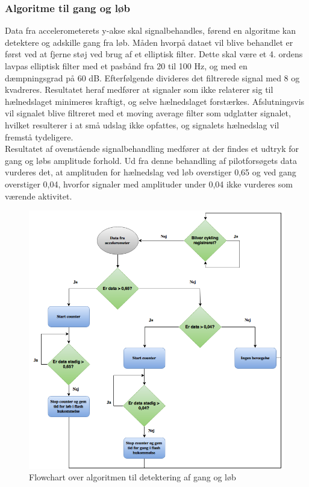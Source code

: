 \subsubsection{Algoritme til gang og løb}
Data fra accelerometerets y-akse skal signalbehandles, førend en algoritme kan detektere og adskille gang fra løb. Måden hvorpå dataet vil blive behandlet er først ved at fjerne støj ved brug af et elliptisk filter. Dette skal være et 4. ordens lavpas elliptisk filter med et pasbånd fra 20 til 100 Hz, og med en dæmpningsgrad på 60 dB. Efterfølgende divideres det filtrerede signal med 8 og kvadreres. Resultatet heraf medfører at signaler som ikke relaterer sig til hælnedslaget minimeres kraftigt, og selve hælnedslaget forstærkes.
Afslutningsvis vil signalet blive filtreret med et moving average filter som udglatter signalet, hvilket resulterer i at små udslag ikke opfattes, og signalets hælnedslag vil fremstå tydeligere. \\
Resultatet af ovenstående signalbehandling medfører at der findes et udtryk for gang og løbs amplitude forhold. Ud fra denne behandling af pilotforsøgets data vurderes det, at amplituden for hælnedslag ved løb overstiger 0,65 og ved gang overstiger 0,04, hvorfor signaler med amplituder under 0,04 ikke vurderes som værende aktivitet.
\begin{figure}[H]
	\centering
	\includegraphics[scale=0.5]{figures/cDesign/algoritme_gl.png}
	\caption{Flowchart over algoritmen til detektering af gang og løb}
	\label{fig:algoritme}
\end{figure}

